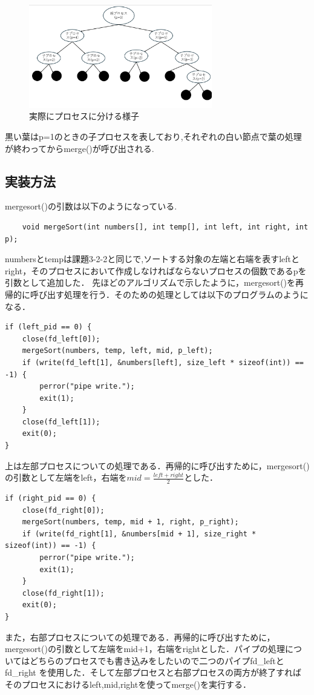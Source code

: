 \documentclass[dvipdfmx]{jarticle}
\begin{document}
\begin{figure}[h]
    \centering
    \includegraphics[width=8cm]{hatten2tree.png}
    \caption{実際にプロセスに分ける様子}
\end{figure}
黒い葉はp=1のときの子プロセスを表しており,それぞれの白い節点で葉の処理が終わってからmerge()が呼び出される.

\subsection{実装方法}
mergesort()の引数は以下のようになっている.
\begin{lstlisting}
    void mergeSort(int numbers[], int temp[], int left, int right, int p);
\end{lstlisting}
numbersとtempは課題3-2-2と同じで,ソートする対象の左端と右端を表すleftとright，そのプロセスにおいて作成しなければならないプロセスの個数であるpを引数として追加した．
先ほどのアルゴリズムで示したように，mergesort()を再帰的に呼び出す処理を行う．そのための処理としては以下のプログラムのようになる．
\begin{lstlisting}
if (left_pid == 0) {
    close(fd_left[0]);
    mergeSort(numbers, temp, left, mid, p_left);
    if (write(fd_left[1], &numbers[left], size_left * sizeof(int)) == -1) {
        perror("pipe write.");
        exit(1);
    }
    close(fd_left[1]);
    exit(0);
}
\end{lstlisting}
上は左部プロセスについての処理である．再帰的に呼び出すために，mergesort()の引数として左端をleft，右端を$mid = \frac{left+right}{2}$とした．
\begin{lstlisting}
if (right_pid == 0) {
    close(fd_right[0]);
    mergeSort(numbers, temp, mid + 1, right, p_right);
    if (write(fd_right[1], &numbers[mid + 1], size_right * sizeof(int)) == -1) {
        perror("pipe write.");
        exit(1);
    }
    close(fd_right[1]);
    exit(0);
}
\end{lstlisting}
また，右部プロセスについての処理である．再帰的に呼び出すために，mergesort()の引数として左端をmid+1，右端をrightとした．パイプの処理についてはどちらのプロセスでも書き込みをしたいので二つのパイプfd\_leftとfd\_right
を使用した．そして左部プロセスと右部プロセスの両方が終了すればそのプロセスにおけるleft,mid,rightを使ってmerge()を実行する．
\end{document}
